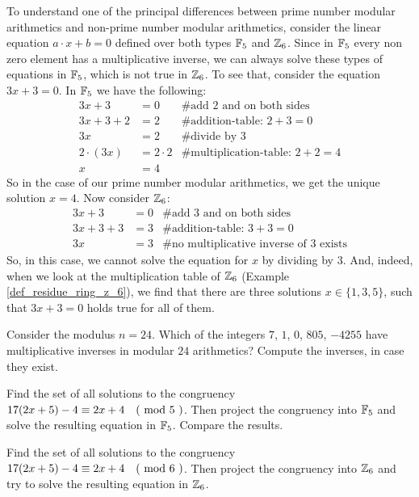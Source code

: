 \begin{example}
To understand one of the principal differences between prime number modular arithmetics and non-prime number modular arithmetics, consider the linear equation $a\cdot x +b=0$ defined over both types $\mathbb{F}_5$ and $\mathbb{Z}_6$. Since in $\mathbb{F}_5$ every non zero element has a multiplicative inverse, we can always solve these types of equations in $\mathbb{F}_5$, which is not true in $\mathbb{Z}_6$. To see that, consider the equation $3x+3=0$. In $\mathbb{F}_5$ we have the following:
\begin{align*}
3x+3    &= 0 & \text{\# add 2 and on both sides} \\
3x+3+2  &= 2 & \text{\# addition-table: } 2+3 = 0 \\
3x      &= 2 & \text{\# divide by } 3 \\
2\cdot(3x)      &= 2\cdot 2 & \text{\# multiplication-table: } 2+2=4 \\
 x      &= 4 & 
\end{align*}
So in the case of our prime number modular arithmetics, we get the unique solution $x=4$. Now consider $\mathbb{Z}_6$:
\begin{align*}
3x+3    &= 0 & \text{\# add 3 and on both sides} \\
3x+3+3  &= 3 & \text{\# addition-table: } 3+3 = 0 \\
3x      &= 3 & \text{\# no multiplicative inverse of 3  exists}
\end{align*}
So, in this case, we cannot solve the equation for $x$ by dividing by $3$. And, indeed, when we look at the multiplication table of $\mathbb{Z}_6$ (Example \ref{def_residue_ring_z_6}), we find that there are three solutions $x\in\{1,3,5\}$, such that $3x+3=0$ holds true for all of them.
\end{example}
\begin{exercise}
Consider the modulus $n=24$. Which of the integers $7$, $1$, $0$, $805$, $-4255$ have multiplicative inverses in modular $24$ arithmetics? Compute the inverses, in case they exist.
\end{exercise}
\begin{exercise}
Find the set of all solutions to the congruency $17(2x+5)-4 \equiv 2x+4 \quad \text{( mod } 5 \text{ )}$. Then project the congruency into $\mathbb{F}_5$ and solve the resulting equation in $\mathbb{F}_5$. Compare the results. 
\end{exercise}
\begin{exercise}
Find the set of all solutions to the congruency $17(2x+5)-4 \equiv 2x+4 \quad \text{( mod } 6 \text{ )}$. Then project the congruency into $\mathbb{Z}_6$ and try to solve the resulting equation in $\mathbb{Z}_6$.
\end{exercise}
